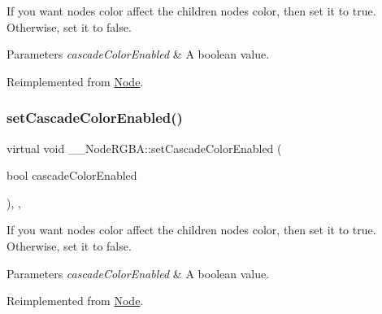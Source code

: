 If you want node\textquotesingle{}s color affect the children node\textquotesingle{}s color, then set it to true. Otherwise, set it to false. 
\begin{DoxyParams}{Parameters}
{\em cascade\+Color\+Enabled} & A boolean value. \\
\hline
\end{DoxyParams}


Reimplemented from \hyperlink{classNode_a4e7f2dde1e3a7d56880f59f1480955e7}{Node}.

\mbox{\label{class____NodeRGBA_a07c6d23e55cc2ba21115d2b93ef25bcd}} 
\subsubsection{\texorpdfstring{set\+Cascade\+Color\+Enabled()}{setCascadeColorEnabled()}\hspace{0.1cm}{\footnotesize\ttfamily [2/2]}}
{\footnotesize\ttfamily virtual void \+\_\+\+\_\+\+Node\+R\+G\+B\+A\+::set\+Cascade\+Color\+Enabled (\begin{DoxyParamCaption}\item[{bool}]{cascade\+Color\+Enabled }\end{DoxyParamCaption})\hspace{0.3cm}{\ttfamily [inline]}, {\ttfamily [override]}, {\ttfamily [virtual]}}

If you want node\textquotesingle{}s color affect the children node\textquotesingle{}s color, then set it to true. Otherwise, set it to false. 
\begin{DoxyParams}{Parameters}
{\em cascade\+Color\+Enabled} & A boolean value. \\
\hline
\end{DoxyParams}


Reimplemented from \hyperlink{classNode_a4e7f2dde1e3a7d56880f59f1480955e7}{Node}.

\mbox{\label{class____NodeRGBA_a10fe85e705700fbe2bd28da1a17eda68}} 
